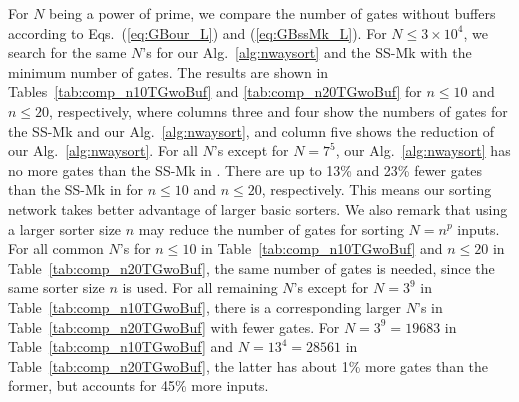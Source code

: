 \documentclass[10pt,journal,cspaper,compsoc]{IEEEtran}
\begin{document}
For $N$ being a power of prime, we compare the number of gates without buffers according to Eqs.~(\ref{eq:GBour_L}) and (\ref{eq:GBssMk_L}).
For $N\le 3\times 10^4$, we search for the same $N$'s for our Alg.~\ref{alg:nwaysort} and the SS-Mk with the minimum number of gates. The results are shown in Tables~\ref{tab:comp_n10TGwoBuf} and \ref{tab:comp_n20TGwoBuf} for $n\le 10$ and $n\le 20$, respectively, where columns three and four show the numbers of gates for the SS-Mk and our Alg.~\ref{alg:nwaysort}, and column five shows the reduction of our Alg.~\ref{alg:nwaysort}.
For all $N$'s except for $N=7^5$, our Alg.~\ref{alg:nwaysort} has no more gates than the SS-Mk in \cite{gao1997sloping}.
There are up to 13\% and 23\% fewer gates than the SS-Mk in \cite{gao1997sloping} for $n\le 10$ and $n\le 20$, respectively. This means our sorting network takes better advantage of larger basic sorters.
We also remark that using a larger sorter size $n$ may reduce the number of gates for sorting $N=n^p$ inputs.
For all common $N$'s for $n\le 10$ in Table~\ref{tab:comp_n10TGwoBuf} and $n\le 20$ in Table~\ref{tab:comp_n20TGwoBuf}, the same number of gates is needed, since the same sorter size $n$ is used.
For all remaining $N$'s except for $N=3^9$ in Table~\ref{tab:comp_n10TGwoBuf}, there is a  corresponding larger $N$'s in Table~\ref{tab:comp_n20TGwoBuf} with fewer gates.
For $N=3^9=19683$ in Table~\ref{tab:comp_n10TGwoBuf} and $N=13^4=28561$ in Table~\ref{tab:comp_n20TGwoBuf}, the latter has about 1\% more gates than the former, but accounts for 45\% more inputs.
\end{document}
